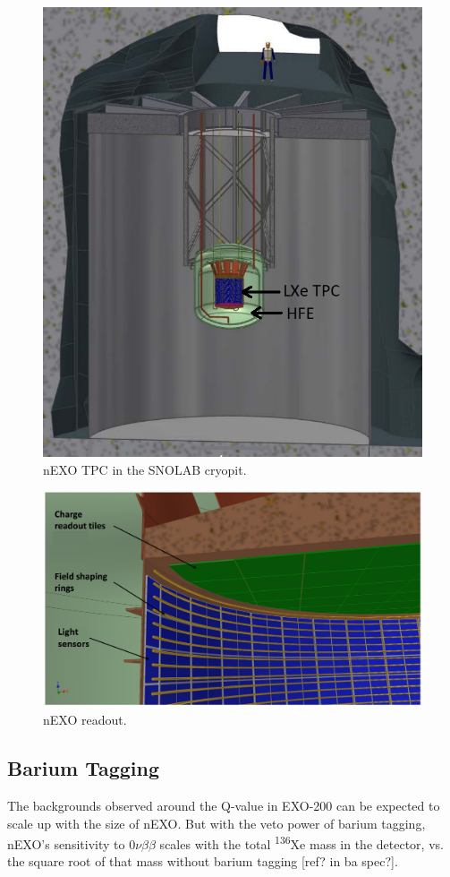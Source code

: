 \begin{figure}[H]
	\centering
	\includegraphics[width=.7\textwidth]{figures/nEXO_cryopit.png}
	\caption{nEXO TPC in the SNOLAB cryopit.}
\label{fig:nEXO_cryopit}
\end{figure}

\begin{figure}[H]
	\centering
	\includegraphics[width=.7\textwidth]{figures/nEXO_readout.png}
	\caption{nEXO readout.}
\label{fig:nEXO_readout}
\end{figure}

\subsection{Barium Tagging}

The backgrounds observed around the Q-value in EXO-200 can be expected to scale up with the size of nEXO.  But with the veto power of barium tagging, nEXO's sensitivity to $0\nu\beta\beta$ scales with the total \textsuperscript{136}Xe mass in the detector, vs. the square root of that mass without barium tagging [ref? in ba spec?].

